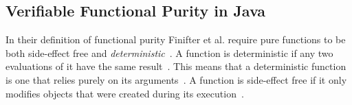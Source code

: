 \documentclass[a4paper,12pt]{article}
\begin{document}




\subsection{Verifiable Functional Purity in Java} \label{sub:Verifiable-Functional-Purity-in-Java}

In their definition of functional purity Finifter et al. require pure functions to be both side-effect free and \textit{deterministic}~\cite{purity-in-java}. A function is deterministic if any two evaluations of it have the same result~\cite{purity-in-java}. This means that a deterministic function is one that relies purely on its arguments~\cite{purity-in-java}. A function is side-effect free if it only modifies objects that were created during its execution~\cite{purity-in-java}.
\end{document}
